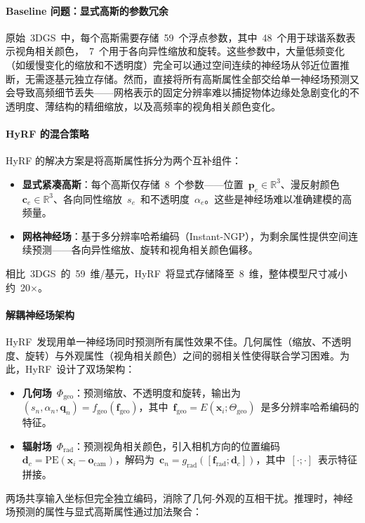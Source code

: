 \paragraph{Baseline 问题：显式高斯的参数冗余}

原始~3DGS~中，每个高斯需要存储~59~个浮点参数，其中~48~个用于球谐系数表示视角相关颜色，~7~个用于各向异性缩放和旋转。这些参数中，大量低频变化（如缓慢变化的缩放和不透明度）完全可以通过空间连续的神经场从邻近位置推断，无需逐基元独立存储。然而，直接将所有高斯属性全部交给单一神经场预测又会导致高频细节丢失——网格表示的固定分辨率难以捕捉物体边缘处急剧变化的不透明度、薄结构的精细缩放，以及高频率的视角相关颜色变化。

\paragraph{HyRF 的混合策略}

HyRF 的解决方案是将高斯属性拆分为两个互补组件：
\begin{itemize}
\item \textbf{显式紧凑高斯}：每个高斯仅存储~8~个参数——位置~$\mathbf{p}_e \in \mathbb{R}^3$、漫反射颜色~$\mathbf{c}_e \in \mathbb{R}^3$、各向同性缩放~$s_e$~和不透明度~$\alpha_e$。这些是神经场难以准确建模的高频量。
\item \textbf{网格神经场}：基于多分辨率哈希编码（Instant-NGP），为剩余属性提供空间连续预测——各向异性缩放、旋转和视角相关颜色偏移。
\end{itemize}
相比~3DGS~的~59~维/基元，HyRF~将显式存储降至~8~维，整体模型尺寸减小约~20$\times$。

\paragraph{解耦神经场架构}

HyRF~发现用单一神经场同时预测所有属性效果不佳。几何属性（缩放、不透明度、旋转）与外观属性（视角相关颜色）之间的弱相关性使得联合学习困难。为此，HyRF~设计了双场架构：
\begin{itemize}
\item \textbf{几何场}~$\Phi_\text{geo}$：预测缩放、不透明度和旋转，输出为~$(s_n, \alpha_n, \mathbf{q}_n) = f_\text{geo}(\mathbf{f}_\text{geo})$，其中~$\mathbf{f}_\text{geo} = E(\mathbf{x}_i; \Theta_\text{geo})$~是多分辨率哈希编码的特征。
\item \textbf{辐射场}~$\Phi_\text{rad}$：预测视角相关颜色，引入相机方向的位置编码~$\mathbf{d}_c = \text{PE}(\mathbf{x}_i - \mathbf{o}_\text{cam})$，解码为~$\mathbf{c}_n = g_\text{rad}([\mathbf{f}_\text{rad}; \mathbf{d}_c])$，其中~$[\cdot;\cdot]$~表示特征拼接。
\end{itemize}
两场共享输入坐标但完全独立编码，消除了几何-外观的互相干扰。推理时，神经场预测的属性与显式高斯属性通过加法聚合：

